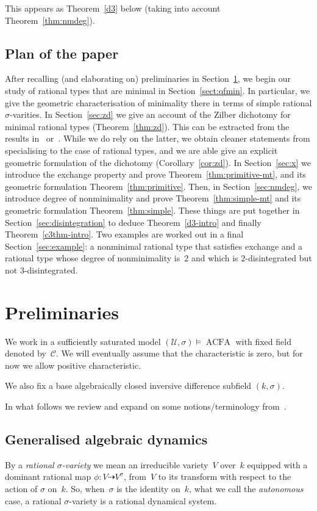 \documentclass[\DocOpts]{amsart}
\theoremstyle{definition}
\def\acfa{\operatorname{ACFA}}
\def\C{\mathcal{C}}
\def\U{\mathcal{U}}
\newcommand{\<}{\langle}
\renewcommand{\>}{\rangle}
\newcommand{\dto}{\dashrightarrow}
\begin{document}
This appears as Theorem~\ref{d3} below (taking into account Theorem~\ref{thm:nmdeg}).

\medskip
\subsection{Plan of the paper}
After recalling (and elaborating on) preliminaries in Section~\ref{prelims}, we begin our study of rational types that are minimal in Section~\ref{sect:qfmin}.
In particular, we give the geometric characterisation of minimality there in terms of simple rational $\sigma$-varities.
In Section~\ref{sec:zd} we give an account of the Zilber dichotomy for minimal rational types (Theorem~\ref{thm:zd}).
This can be extracted from the results in~\cite{acfa} or~\cite{pillay-ziegler}.
While we do rely on the latter,  we obtain cleaner statements from specialising to the case of rational types, and we are able give an explicit geometric formulation of the dichotomy (Corollary~\ref{cor:zd}).
In Section~\ref{sec:x} we introduce the exchange property and prove Theorem~\ref{thm:primitive-mt}, and its geometric formulation Theorem~\ref{thm:primitive}.
Then, in Section~\ref{sec:nmdeg}, we introduce degree of nonminimality and prove Theorem~\ref{thm:simple-mt} and its geometric formulation Theorem~\ref{thm:simple}.
These things are put together in Section~\ref{sec:disintegration} to deduce Theorem~\ref{d3-intro} and finally Theorem~\ref{c3thm-intro}.
Two examples are worked out in a final Section~\ref{sec:example}: a nonminimal rational type that satisfies exchange and a rational type whose degree of nonminimality is~$2$ and which is $2$-disintegrated but not $3$-disintegrated.

\bigskip
\section{Preliminaries}
\label{prelims}

\noindent
We work in a sufficiently saturated model $(\U,\sigma)\models \acfa$ with fixed field denoted by~$\C$.
We will eventually assume that the characteristic is zero, but for now we allow positive characteristic.

We also fix a base algebraically closed inversive difference subfield $(k,\sigma)$.

In what follows we review and expand on some notions/terminology from~\cite{qfint}.

\medskip
\subsection{Generalised algebraic dynamics}
\label{subsect:rsv}
By a {\em rational $\sigma$-variety} we mean an irreducible variety~$V$ over~$k$ equipped with a dominant rational map $\phi:V\dto V^\sigma$, from~$V$ to its transform with respect to the action of $\sigma$ on~$k$.
So, when~$\sigma$ is the identity on~$k$, what we call the {\em autonomous} case, a rational $\sigma$-variety is a rational dynamical system.
\end{document}
